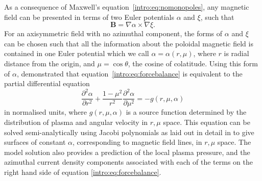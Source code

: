 As a consequence of Maxwell's equation~\ref{intro:eq:nomonopoles}, any magnetic field can be presented in terms of two Euler potentials $\alpha$ and $\xi$, such that 
\begin{equation}
\boldsymbol{B} = \nabla \alpha \times \nabla \xi.
\end{equation}
For an axisymmetric field with no azimuthal component, the forms of $\alpha$ and $\xi$ can be chosen such that all the information about the poloidal magnetic field is contained in one Euler potential which we call $\alpha = \alpha(r,\mu)$, where $r$ is radial distance from the origin, and $\mu = \cos\theta$, the cosine of colatitude. Using this form of $\alpha$, \citet{caudal1986} demonstrated that equation~\ref{intro:eq:forcebalance} is equivalent to the partial differential equation
\begin{equation}\label{intro:eq:pde}
\frac{\partial^2\alpha}{\partial r^2} + \frac{1-\mu^2}{r^2} \frac{\partial^2\alpha}{\partial \mu^2} = -g(r,\mu,\alpha)
\end{equation}
in normalised units, where $g(r,\mu,\alpha)$ is a source function determined by the distribution of plasma and angular velocity in $r,\mu$ space. This equation can be solved semi-analytically using Jacobi polynomials as laid out in detail in \citet[Appendix]{achilleos2010a} to give surfaces of constant $\alpha$, corresponding to magnetic field lines, in $r, \mu$ space. The model solution also provides a prediction of the local plasma pressure, and the azimuthal current density components associated with each of the terms on the right hand side of equation \ref{intro:eq:forcebalance}. 

